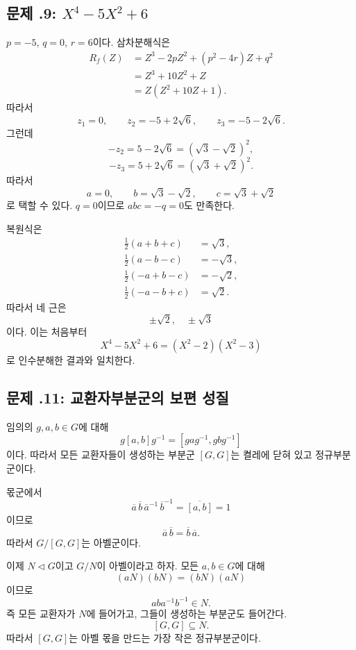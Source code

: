\subsection*{문제 \thechapter.9: $X^4-5X^2+6$}

\begin{solution}
$p=-5$, $q=0$, $r=6$이다. 삼차분해식은
\[
\begin{aligned}
R_f(Z)
&=Z^3-2pZ^2+(p^2-4r)Z+q^2\\
&=Z^3+10Z^2+Z\\
&=Z(Z^2+10Z+1).
\end{aligned}
\]
따라서
\[
  z_1=0,
  \qquad
  z_2=-5+2\sqrt6,
  \qquad
  z_3=-5-2\sqrt6.
\]
그런데
\[
  -z_2=5-2\sqrt6=(\sqrt3-\sqrt2)^2,
\]
\[
  -z_3=5+2\sqrt6=(\sqrt3+\sqrt2)^2.
\]
따라서
\[
  a=0,\qquad
  b=\sqrt3-\sqrt2,\qquad
  c=\sqrt3+\sqrt2
\]
로 택할 수 있다. $q=0$이므로 $abc=-q=0$도 만족한다.

복원식은
\[
\begin{aligned}
\frac12(a+b+c)&=\sqrt3,\\
\frac12(a-b-c)&=-\sqrt3,\\
\frac12(-a+b-c)&=-\sqrt2,\\
\frac12(-a-b+c)&=\sqrt2.
\end{aligned}
\]
따라서 네 근은
\[
  \boxed{\pm\sqrt2,\quad\pm\sqrt3}
\]
이다. 이는 처음부터
\[
  X^4-5X^2+6=(X^2-2)(X^2-3)
\]
로 인수분해한 결과와 일치한다.
\end{solution}

\subsection*{문제 \thechapter.11: 교환자부분군의 보편 성질}

\begin{solution}
임의의 $g,a,b\in G$에 대해
\[
  g[a,b]g^{-1}
  =[gag^{-1},gbg^{-1}]
\]
이다. 따라서 모든 교환자들이 생성하는 부분군 $[G,G]$는 켤레에 닫혀 있고 정규부분군이다.

몫군에서
\[
  \overline a\,\overline b\,
  \overline a^{-1}\,\overline b^{-1}
  =\overline{[a,b]}=1
\]
이므로
\[
  \overline a\,\overline b
  =\overline b\,\overline a.
\]
따라서 $G/[G,G]$는 아벨군이다.

이제 $N\triangleleft G$이고 $G/N$이 아벨이라고 하자. 모든 $a,b\in G$에 대해
\[
  (aN)(bN)=(bN)(aN)
\]
이므로
\[
  aba^{-1}b^{-1}\in N.
\]
즉 모든 교환자가 $N$에 들어가고, 그들이 생성하는 부분군도 들어간다.
\[
  \boxed{[G,G]\subseteq N.}
\]
따라서 $[G,G]$는 아벨 몫을 만드는 가장 작은 정규부분군이다.
\end{solution}

